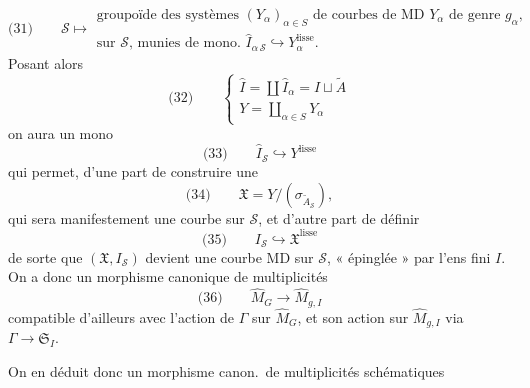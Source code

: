 \documentclass[11pt,a4paper]{article}
\begin{document}
\[
\text{(31)}\qquad \mathcal{S} \longmapsto
\begin{array}{l}
\text{groupoïde des systèmes } (Y_\alpha)_{\alpha\in S} \text{ de courbes de MD } Y_\alpha \text{ de genre } g_\alpha\text{,} \\
\text{sur } \mathcal{S}\text{, munies de mono.\ } \hat{I}_{\alpha\,\mathcal{S}} \hookrightarrow Y_\alpha^{\text{lisse}} .
\end{array}
\]
Posant alors
\[
\text{(32)}\qquad
\begin{cases}
\hat{I} = \coprod \hat{I}_\alpha = I \sqcup \tilde{A} \\
Y = \coprod_{\alpha\in S} Y_\alpha
\end{cases}
\]
on aura un mono
\[
\text{(33)}\qquad \hat{I}_{\mathcal{S}} \hookrightarrow Y^{\text{lisse}}
\]
qui permet, d'une part de construire une
\[
\text{(34)}\qquad \mathfrak{X} = Y/(\sigma_{\tilde{A}_{\mathcal{S}}}) ,
\]
qui sera manifestement une courbe   sur $\mathcal{S}$, et d'autre part de définir
\[
\text{(35)}\qquad I_{\mathcal{S}} \hookrightarrow \mathfrak{X}^{\text{lisse}}
\]
de sorte que $(\mathfrak{X}, I_{\mathcal{S}})$ devient une courbe  MD sur $\mathcal{S}$, « épinglée » par l'ens fini $I$. On a donc un morphisme canonique de multiplicités
\[
\text{(36)}\qquad \hat{M}_G \longrightarrow \hat{M}_{g,I}
\]
compatible d'ailleurs avec l'action de $\Gamma$ sur $\hat{M}_G$, et son action sur $\hat{M}_{g,I}$ via $\Gamma \to \mathfrak{S}_I$.

On en déduit donc un morphisme canon.\ de multiplicités schématiques

\end{document}
